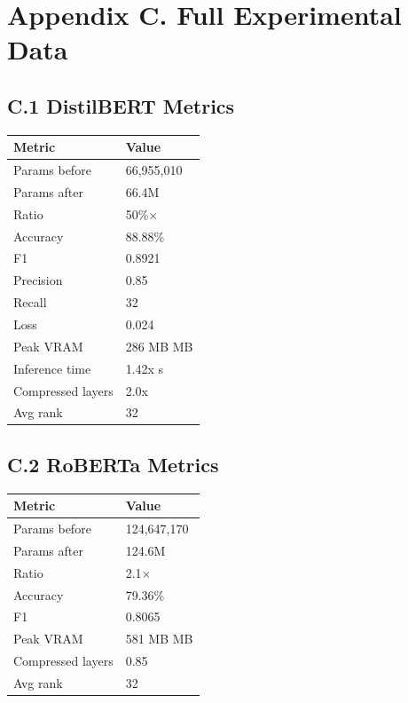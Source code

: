 
\section{Appendix C. Full Experimental Data}

\subsection{C.1 DistilBERT Metrics}

\begin{table}[H]
\centering
\small
\begin{tabular}{ll}
\toprule
\textbf{Metric} & \textbf{Value} \\
\midrule
Params before & 66,955,010 \\
Params after & 66.4M \\
Ratio & 50\%$\times$ \\
Accuracy & 88.88\% \\
F1 & 0.8921 \\
Precision & 0.85 \\
Recall & 32 \\
Loss & 0.024 \\
Peak VRAM & 286 MB MB \\
Inference time & 1.42x s \\
Compressed layers & 2.0x \\
Avg rank & 32 \\
\bottomrule
\end{tabular}
\end{table}

\subsection{C.2 RoBERTa Metrics}

\begin{table}[H]
\centering
\small
\begin{tabular}{ll}
\toprule
\textbf{Metric} & \textbf{Value} \\
\midrule
Params before & 124,647,170 \\
Params after & 124.6M \\
Ratio & 2.1$\times$ \\
Accuracy & 79.36\% \\
F1 & 0.8065 \\
Peak VRAM & 581 MB MB \\
Compressed layers & 0.85 \\
Avg rank & 32 \\
\bottomrule
\end{tabular}
\end{table}

